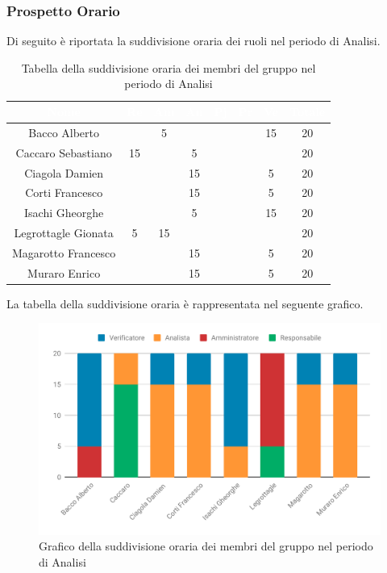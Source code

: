 \subsubsection{Prospetto Orario}
Di seguito è riportata la suddivisione oraria dei ruoli nel periodo di Analisi.




\begin{table}[H]	
	\begin{center}
	    \begin{tabular}{cccccccc}
			\rowcolor{greySWEight}
			\textcolor{white}{\textbf{Nome}} & \textcolor{white}{\textbf{Re}} & \textcolor{white}{\textbf{Am}} & \textcolor{white}{\textbf{An}} & \textcolor{white}{\textbf{Pj}} & \textcolor{white}{\textbf{Pr}} & \textcolor{white}{\textbf{Ve}} & \textcolor{white}{\textbf{Totale}}
			\\ \hline
			Bacco Alberto & & 5 & & & & 15 & 20 \\
			Caccaro Sebastiano & 15 & & 5 & & & & 20 \\
			Ciagola Damien & & & 15 & & & 5 & 20\\
			Corti Francesco & & & 15 & & & 5 & 20\\
			Isachi Gheorghe & & & 5 & & & 15 & 20\\
			Legrottagle Gionata & 5 & 15 & & & & & 20\\
			Magarotto Francesco & & & 15 & & & 5 & 20\\
			Muraro Enrico & & & 15 & & & 5 & 20\\
			\end{tabular}
	    \caption{Tabella della suddivisione oraria dei membri del gruppo nel periodo di Analisi} \label{tab:tabellaPersoneAnalisi} 
	\end{center}
\end{table}

La tabella della suddivisione oraria è rappresentata nel seguente grafico.
\begin{figure}[H]
	\includegraphics[width=1\linewidth]{Preventivo/grafici/AN1.pdf}
	\caption{Grafico della suddivisione oraria dei membri del gruppo nel periodo di Analisi}
\end{figure}

